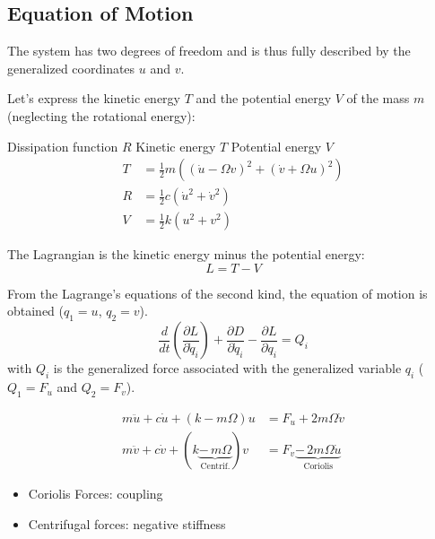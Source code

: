 \documentclass{ISMA_USD2020}
\begin{document}
\subsection{Equation of Motion}
\label{sec:org926ba54}
The system has two degrees of freedom and is thus fully described by the generalized coordinates \(u\) and \(v\).

Let's express the kinetic energy \(T\) and the potential energy \(V\) of the mass \(m\) (neglecting the rotational energy):

Dissipation function \(R\)
Kinetic energy \(T\)
Potential energy \(V\)
\begin{subequations}
  \begin{align}
    T & = \frac{1}{2} m \left( \left( \dot{u} - \Omega v \right)^2 + \left( \dot{v} + \Omega u \right)^2 \right) \\
    R & = \frac{1}{2} c \left( \dot{u}^2 + \dot{v}^2 \right) \\
    V & = \frac{1}{2} k \left( u^2 + v^2 \right)
  \end{align}
\end{subequations}

The Lagrangian is the kinetic energy minus the potential energy:
\begin{equation}
L = T - V
\end{equation}

From the Lagrange's equations of the second kind, the equation of motion is obtained (\(q_1 = u\), \(q_2 = v\)).
\begin{equation}
  \frac{d}{dt} \left( \frac{\partial L}{\partial \dot{q}_i} \right) + \frac{\partial D}{\partial \dot{q}_i} - \frac{\partial L}{\partial q_i} = Q_i
\end{equation}
with \(Q_i\) is the generalized force associated with the generalized variable \(q_i\) (\(Q_1 = F_u\) and \(Q_2 = F_v\)).


\begin{subequations}
  \begin{align}
    m \ddot{u} + c \dot{u} + ( k - m \Omega ) u &= F_u + 2 m \Omega \dot{v} \\
    m \ddot{v} + c \dot{v} + ( k \underbrace{-\,m \Omega}_{\text{Centrif.}} ) v &= F_v \underbrace{-\,2 m \Omega \dot{u}}_{\text{Coriolis}}
  \end{align}
\end{subequations}

\begin{itemize}
\item Coriolis Forces: coupling
\item Centrifugal forces: negative stiffness
\end{itemize}
\end{document}
